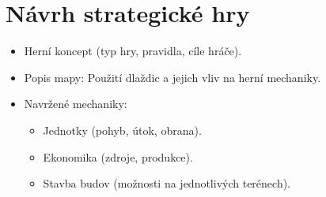 \section{Návrh strategické hry}
\begin{itemize}
    \item Herní koncept (typ hry, pravidla, cíle hráče).
    \item Popis mapy: Použití dlaždic a jejich vliv na herní mechaniky.
    \item Navržené mechaniky:
    \begin{itemize}
        \item Jednotky (pohyb, útok, obrana).
        \item Ekonomika (zdroje, produkce).
        \item Stavba budov (možnosti na jednotlivých terénech).
    \end{itemize}
\end{itemize}

